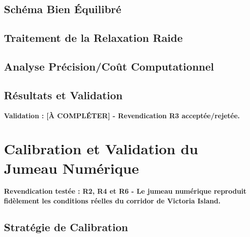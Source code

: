 \subsection{Schéma Bien Équilibré}
\label{subsec:schema_equilibre}

\subsection{Traitement de la Relaxation Raide}
\label{subsec:relaxation_raide}

\subsection{Analyse Précision/Coût Computationnel}
\label{subsec:precision_cout}

\subsection{Résultats et Validation}
\label{subsec:resultats_numerique}

\textbf{Validation : [À COMPLÉTER] - Revendication R3 acceptée/rejetée.}

\section{Calibration et Validation du Jumeau Numérique}
\label{sec:validation_jumeau_numerique}

\textbf{Revendication testée : R2, R4 et R6 - Le jumeau numérique reproduit fidèlement les conditions réelles du corridor de Victoria Island.}

\subsection{Stratégie de Calibration}
\label{subsec:strategie_calibration}

